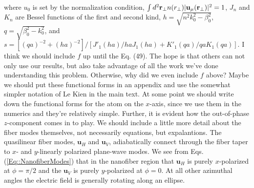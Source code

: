 \documentclass[preprint,aps,pra,onecolumn]{revtex4-1} %
\newcommand{\change}[1]{{\color{RoyalBlue} #1}}
\newcommand{\comment}[1]{{\color{Maroon} #1}}
\begin{document}
where $u_0$ is set by the normalization condition, $\int d^2 \mathbf{r}_\perp n(r_\perp) | \mathbf{u}_\mu(\mathbf{r}_\perp)|^2=1$, $J_n$ and $K_n$ are Bessel functions of the first and second kind, $h=\sqrt{n^2 k_0^2 - \beta_0^2}$, $q=\sqrt{\beta_0^2- k_0^2}$, and $s = [(q a)^{-2} + (h a)^{-2}]/[J'_1(ha)/haJ_1(ha) + K'_1(qa)/qaK_1(qa)]$.  \comment{ I think we should include $f$ up until the Eq. (49).  The hope is that others can not only use our results, but also take advantage of all the work we've done understanding this problem.  Otherwise, why did we even include $f$ above?  Maybe we should put these functional forms in an appendix and use the somewhat simpler notation of Le Kien in the main text.  At some point we should write down the functional forms for the atom on the $x$-axis, since we use them in the numerics and they're relatively simple.  Further, it is evident how the out-of-phase $z$-component comes in to play.  We should include a little more detail about the fiber modes themselves, not necessarily equations, but expalantions.}  \change{The quasilinear fiber modes, $\mathbf{u}_H$ and $\mathbf{u}_V$, adiabatically connect through the fiber taper to $x$- and $y$-linearly polarized plane-wave modes.  We see from Eqs. (\ref{Eq::NanofiberModes}) that in the nanofiber region that $\mathbf{u}_H$ is purely $x$-polarized at $\phi = \pi/2$ and the  $\mathbf{u}_V$ is purely $y$-polarized at $\phi = 0$.  At all other azimuthal angles the electric field is generally rotating along an ellipse. }  
\end{document}
